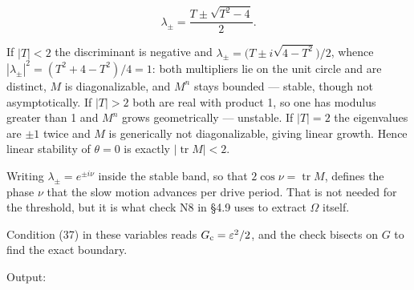 \documentclass[11pt,a4paper]{article}
\newcommand{\tagmark}[1]{\marginnote{\scriptsize\ttfamily #1}}
\newcommand{\Dtag}{\tagmark{[D]}}   %
\begin{document}
\begin{equation}
\lambda_\pm = \frac{T \pm \sqrt{T^2-4}}{2}. \tag{59}
\end{equation}

If \(|T|<2\) the discriminant is negative and
\(\lambda_\pm=\bigl(T\pm i\sqrt{4-T^2}\bigr)/2\), whence
\(|\lambda_\pm|^2=(T^2+4-T^2)/4=1\): both multipliers lie on the unit circle and
are distinct, \(M\) is diagonalizable, and \(M^n\) stays bounded --- stable, though
not asymptotically. If \(|T|>2\) both are real with product 1, so one has modulus
greater than 1 and \(M^n\) grows geometrically --- unstable. If \(|T|=2\) the
eigenvalues are \(\pm1\) twice and \(M\) is generically not diagonalizable, giving
linear growth. Hence linear stability of \(\theta=0\) is exactly
\(|\operatorname{tr}M|<2\).

\Dtag{} Writing \(\lambda_\pm=e^{\pm i\nu}\) inside the stable band, so that
\(2\cos\nu=\operatorname{tr}M\), defines the phase \(\nu\) that the slow motion
advances per drive period. That is not needed for the threshold, but it is what
check N8 in §4.9 uses to extract \(\Omega\) itself.

Condition (37) in these variables reads \(G_{\rm c}=\varepsilon^2/2\), and the
check bisects on \(G\) to find the exact boundary.

Output:
\end{document}
